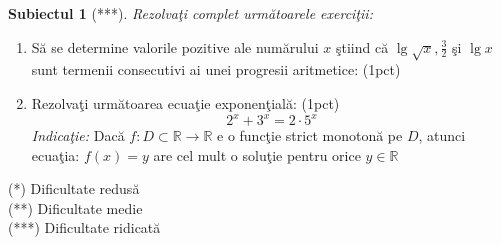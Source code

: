\documentclass[a4paper, 12pt]{scrartcl}
\theoremstyle{plain}
\newtheorem{subiect}{Subiectul}
\newcommand{\Subiect}[2]{
    {
        \large
        \begin{subiect}[#2]
            #1
        \end{subiect}
    }
}
\begin{document}
\Subiect{Rezolva\c ti complet urm\u atoarele exerci\c tii: }{***}
\begin{enumerate}[label=\textbf{\arabic*})]
    \item {
        S\u a se determine valorile pozitive ale num\u arului \(x\) \c stiind c\u a \( \lg \sqrt{x}, \frac{3}{2} \) \c 
        si \( \lg x \) sunt termenii consecutivi ai unei progresii aritmetice:  \hfill (1pct)
    }
    \item {
        Rezolva\c ti urm\u atoarea ecua\c tie exponen\c tial\u a: \hfill (1pct)
        \[
            2^x + 3^x = 2 \cdot 5^x    
        \]
        \textit{Indica\c tie:} Dac\u a \( f:D \subset \mathbb{R} \rightarrow \mathbb{R} \) e o func\c tie strict monoton\u a pe \(D\),
        atunci ecua\c tia: \( f(x) = y \) are cel mult o solu\c tie pentru orice \( y \in \mathbb{R} \) 
    }
\end{enumerate}

\vfill

\noindent
(*) Dificultate redus\u a \\
(**) Dificultate medie \\
(***) Dificultate ridicat\u a
\end{document}
